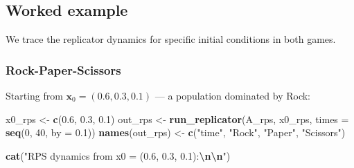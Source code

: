 \documentclass[
]{article}
\newenvironment{Shaded}{\begin{snugshade}}{\end{snugshade}}
\newcommand{\AttributeTok}[1]{\textcolor[rgb]{0.13,0.29,0.53}{#1}}
\newcommand{\ControlFlowTok}[1]{\textcolor[rgb]{0.13,0.29,0.53}{\textbf{#1}}}
\newcommand{\DecValTok}[1]{\textcolor[rgb]{0.00,0.00,0.81}{#1}}
\newcommand{\FloatTok}[1]{\textcolor[rgb]{0.00,0.00,0.81}{#1}}
\newcommand{\FunctionTok}[1]{\textcolor[rgb]{0.13,0.29,0.53}{\textbf{#1}}}
\newcommand{\NormalTok}[1]{#1}
\newcommand{\OtherTok}[1]{\textcolor[rgb]{0.56,0.35,0.01}{#1}}
\newcommand{\SpecialCharTok}[1]{\textcolor[rgb]{0.81,0.36,0.00}{\textbf{#1}}}
\newcommand{\StringTok}[1]{\textcolor[rgb]{0.31,0.60,0.02}{#1}}
\begin{document}
\begin{Shaded}
\end{Shaded}

\subsection{Worked example}\label{worked-example}

We trace the replicator dynamics for specific initial conditions in both
games.

\subsubsection{Rock-Paper-Scissors}\label{rock-paper-scissors}

Starting from \(\mathbf{x}_0 = (0.6, 0.3, 0.1)\) --- a population
dominated by Rock:

\begin{Shaded}
\begin{Highlighting}[]
\NormalTok{x0\_rps }\OtherTok{\textless{}{-}} \FunctionTok{c}\NormalTok{(}\FloatTok{0.6}\NormalTok{, }\FloatTok{0.3}\NormalTok{, }\FloatTok{0.1}\NormalTok{)}
\NormalTok{out\_rps }\OtherTok{\textless{}{-}} \FunctionTok{run\_replicator}\NormalTok{(A\_rps, x0\_rps, }\AttributeTok{times =} \FunctionTok{seq}\NormalTok{(}\DecValTok{0}\NormalTok{, }\DecValTok{40}\NormalTok{, }\AttributeTok{by =} \FloatTok{0.1}\NormalTok{))}
\FunctionTok{names}\NormalTok{(out\_rps) }\OtherTok{\textless{}{-}} \FunctionTok{c}\NormalTok{(}\StringTok{"time"}\NormalTok{, }\StringTok{"Rock"}\NormalTok{, }\StringTok{"Paper"}\NormalTok{, }\StringTok{"Scissors"}\NormalTok{)}

\FunctionTok{cat}\NormalTok{(}\StringTok{"RPS dynamics from x0 = (0.6, 0.3, 0.1):}\SpecialCharTok{\textbackslash{}n\textbackslash{}n}\StringTok{"}\NormalTok{)}
\end{Highlighting}
\end{Shaded}
\end{document}
